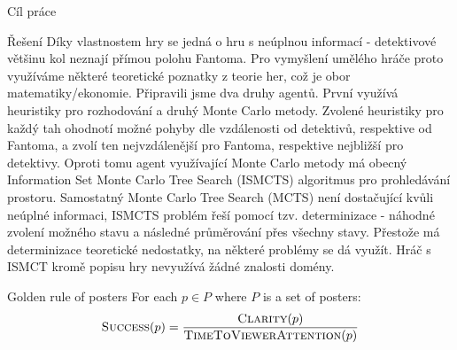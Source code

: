 \documentclass[portrait,a0paper,fontscale=0.25]{baposter}
\begin{document}
\begin{poster}
\begin{posterbox}[column=0, name=goals, below=background]{Cíl práce}
\end{posterbox}

\begin{posterbox}[column=0, name=something1, below=goals]{Řešení}
Díky vlastnostem hry se jedná o hru s neúplnou informací - detektivové většinu kol neznají přímou polohu Fantoma. Pro vymyšlení umělého hráče proto využíváme některé teoretické poznatky z teorie her, což je obor matematiky/ekonomie. 
Připravili jsme dva druhy agentů. První využívá heuristiky pro rozhodování a druhý Monte Carlo metody. Zvolené heuristiky pro každý tah ohodnotí možné pohyby dle vzdálenosti od detektivů, respektive od Fantoma, a zvolí ten nejvzdálenější pro Fantoma, respektive nejbližší pro detektivy. Oproti tomu agent využívající Monte Carlo metody má obecný Information Set Monte Carlo Tree Search (ISMCTS) algoritmus pro prohledávání prostoru. Samostatný Monte Carlo Tree Search (MCTS) není dostačující kvůli neúplné informaci, ISMCTS problém řeší pomocí tzv. determinizace - náhodné zvolení možného stavu a následné průměrování přes všechny stavy. Přestože má determinizace teoretické nedostatky, na některé problémy se dá využít. Hráč s ISMCT kromě popisu hry nevyužívá žádné znalosti domény.





\end{posterbox}

\begin{posterbox}[column=0, name=something2, below=something1, headerColorOne=yellow!80!orange!95!black, boxColorOne=yellow!33]{Golden rule of posters}
For each $p \in P$ where $P$ is a set of posters:
$$ \textsc{Success}(p) = \frac{\textsc{Clarity}(p)}{\textsc{TimeToViewerAttention}(p)} $$
\end{posterbox}


\end{poster}
\end{document}

